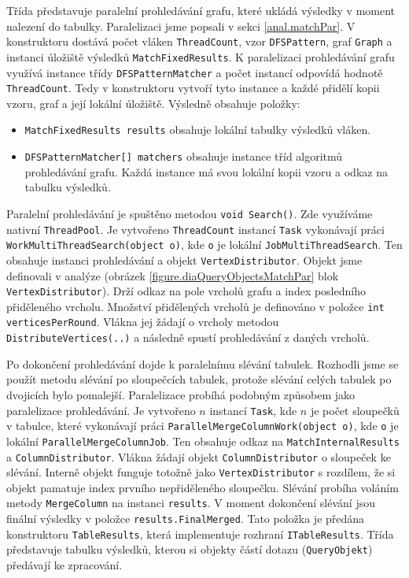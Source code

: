 Třída představuje paralelní prohledávání grafu, které ukládá výsledky v moment nalezení do tabulky.
Paralelizaci jsme popsali v sekci \ref{anal.matchPar}.
V konstruktoru dostává počet vláken \texttt{ThreadCount}, vzor \texttt{DFSPattern}, graf \texttt{Graph} a instanci úložiště výsledků \texttt{MatchFixedResults}.
K paralelizaci prohledávání grafu využívá instance třídy \texttt{DFSPatternMatcher} a počet instancí odpovídá hodnotě \texttt{ThreadCount}.
Tedy v konstruktoru vytvoří tyto instance a každé přidělí kopii vzoru, graf a její lokální úložiště.
Výsledně obsahuje položky:
\begin{itemize}
\item \texttt{MatchFixedResults results} obsahuje lokální tabulky výsledků vláken.
\item \texttt{DFSPatternMatcher[] matchers} obsahuje instance tříd algoritmů prohledávání grafu.
Každá instance má svou lokální kopii vzoru a odkaz na tabulku výsledků.
\end{itemize}
Paralelní prohledávání je spuštěno metodou \texttt{void Search()}.
Zde využíváme nativní \texttt{ThreadPool}.
Je vytvořeno \texttt{ThreadCount} instancí \texttt{Task} vykonávají práci \texttt{WorkMultiThreadSearch(object o)}, kde \texttt{o} je lokální \texttt{JobMultiThreadSearch}.
Ten obsahuje instanci prohledávání a objekt \texttt{VertexDistributor}.
Objekt jsme definovali v analýze (obrázek \ref{figure.diaQueryObjectsMatchPar} blok \texttt{VertexDistributor}).
Drží odkaz na pole vrcholů grafu a index posledního přiděleného vrcholu.
Množství přidělených vrcholů je definováno v položce \texttt{int verticesPerRound}.
Vlákna jej žádají o vrcholy metodou \texttt{DistributeVertices(..)} a následně spustí prohledávání z daných vrcholů.

Po dokončení prohledávání dojde k paralelnímu slévání tabulek.
Rozhodli jsme se použít metodu slévání po sloupečcích tabulek, protože slévání celých tabulek po dvojicích bylo pomalejší.
Paralelizace probíhá podobným způsobem jako paralelizace prohledávání.
Je vytvořeno $n$ instancí \texttt{Task}, kde $n$ je počet sloupečků v tabulce, které vykonávají práci \texttt{ParallelMergeColumnWork(object o)}, kde \texttt{o} je lokální \texttt{ParallelMergeColumnJob}.
Ten obsahuje odkaz na \texttt{MatchInternalResults} a \texttt{ColumnDistributor}.
Vlákna žádají objekt \texttt{ColumnDistributor} o sloupeček ke slévání.
Interně objekt funguje totožně jako \texttt{VertexDistributor} s rozdílem, že si objekt pamatuje index prvního nepřiděleného sloupečku.
Slévání probíha voláním metody \texttt{MergeColumn} na instanci \texttt{results}.
V moment dokončení slévání jsou finální výsledky v položce \texttt{results.FinalMerged}.
Tato položka je předána konstruktoru \texttt{TableResults}, která implementuje rozhraní \texttt{ITableResults}.
Třída představuje tabulku výsledků, kterou si objekty částí dotazu (\texttt{QueryObjekt}) předávají ke zpracování.

